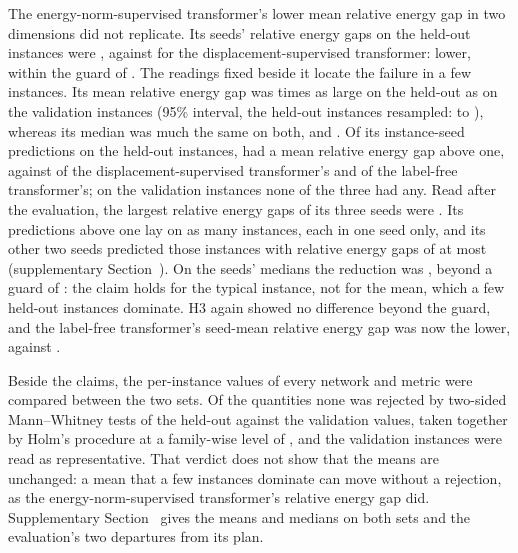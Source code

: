 The energy-norm-supervised transformer's lower mean relative energy gap in two dimensions
did not replicate. Its seeds' relative energy gaps on the held-out instances were
\numHoldHTwoANewSeeds{}, against \numHoldHTwoABaseSeeds{} for the displacement-supervised
transformer: \numHoldHTwoARel{} lower, within the guard of \numHoldHTwoATau{}. The readings
fixed beside it locate the failure in a few instances. Its mean relative energy gap was
\numHoldHTwoARatio{} times as large on the held-out as on the validation instances (95\%
interval, the held-out instances resampled: \numHoldHTwoARatioLow{} to
\numHoldHTwoARatioHigh{}), whereas its median was much the same on both,
\numHoldHTwoAMedHold{} and \numHoldHTwoAMedVal{}. Of its \numHoldTwoPairs{} instance-seed
predictions on the held-out instances, \numHoldTwoWorseInstKnorm{} had a mean relative
energy gap above one, against \numHoldTwoWorseInstLab{} of the displacement-supervised
transformer's and \numHoldTwoWorseInstFree{} of the label-free transformer's; on the validation instances none of the three had any. Read
after the evaluation, the largest
relative energy gaps of its three seeds were \numHoldHTwoATopSeeds{}. Its predictions above
one lay on as many instances, each in one seed only, and its other two seeds predicted those
instances with relative energy gaps of at most \numTailTwoKnormOther{} (supplementary
Section~\SuppTwo{}). On the seeds' medians
the reduction was \numHoldHTwoAMedRel{}, beyond a guard of \numHoldHTwoAMedTau{}: the claim
holds for the typical instance, not for the mean, which a few held-out instances dominate. H3
again showed no difference beyond the guard, and the label-free transformer's seed-mean
relative energy gap was now the lower, \numHoldTwoFreeGap{} against \numHoldTwoKnormGap{}.

Beside the claims, the per-instance values of every network and metric were compared between the two sets. Of the \numHoldVQuantities{} quantities none was rejected by two-sided
Mann--Whitney tests of the held-out against the validation values, taken together by Holm's
procedure at a family-wise level of \numHoldVAlpha{}, and the validation instances were read
as representative. That verdict does not show that the means are unchanged: a mean that a few
instances dominate can move without a rejection, as the energy-norm-supervised transformer's
relative energy gap did. Supplementary Section~\SuppPrereg{} gives the means and medians on
both sets and the evaluation's two departures from its plan.
